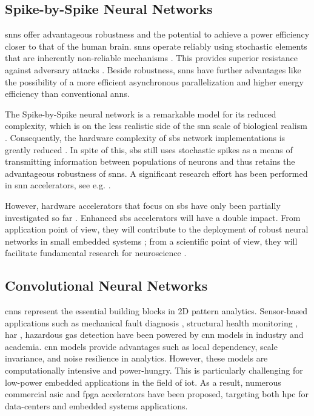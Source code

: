 \subsection{Spike-by-Spike Neural Networks}

\gls{snn}s offer advantageous robustness and the potential to achieve a power efficiency closer to that of the human brain. \gls{snn}s operate reliably using stochastic elements that are inherently non-reliable mechanisms \cite{mcdonnell2011benefits}. This provides superior resistance against adversary attacks
\cite{ernst2007efficient, Dapello2020.06.16.154542}. Beside robustness, \gls{snn}s have further advantages like the possibility of a more efficient asynchronous parallelization and higher energy efficiency than conventional \gls{ann}s.

The Spike-by-Spike neural network is a remarkable model for its reduced complexity, which is on the less realistic side of the \gls{snn} scale of biological realism \cite{rotermund2019Backpropagation,ernst2007efficient}. Consequently, the hardware complexity of \gls{sbs} network implementations is greatly reduced \cite{rotermund2018massively}. In spite of this, \gls{sbs} still uses stochastic spikes as a means of transmitting information between populations of neurons and thus retains the advantageous robustness of \gls{snn}s. A significant research effort has been performed in \gls{snn} accelerators, see e.g. \cite{roy2019towards,bouvier2019spiking,
	young2019review,TrueNorth_Trans15,Spinnaker_Trans13,davies2018loihi}.

However, hardware accelerators that focus on \gls{sbs} have only been partially investigated so far \cite{rotermund2018massively}. Enhanced \gls{sbs} accelerators will have a double impact. From application point of view, they will contribute to the deployment of robust neural networks in small embedded systems \cite{nevarez2020accelerator}; from a scientific point of view, they will facilitate fundamental research for neuroscience \cite{ernst2007efficient,rotermund2019recurrentsbs, dayan2001theoretical}.

\subsection{Convolutional Neural Networks}
\gls{cnn}s represent the essential building blocks in 2D pattern analytics. Sensor-based applications such as mechanical fault diagnosis \cite{li2019sensor,dong2018rolling}, structural health monitoring \cite{nagayama2007structural}, \gls{har} \cite{wang2019deep}, hazardous gas detection\cite{kim2017hazardous} have been powered by \gls{cnn} models in industry and academia. \gls{cnn} models provide advantages such as local dependency, scale invariance, and noise resilience in analytics\cite{du2014leveraging}. However, these models are computationally intensive and power-hungry. This is particularly challenging for low-power embedded applications in the field of \gls{iot}. As a result, numerous commercial \gls{asic} and \gls{fpga} accelerators have been proposed, targeting both \gls{hpc} for data-centers and embedded systems applications.

